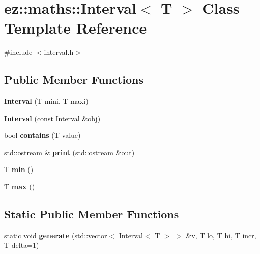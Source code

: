 \hypertarget{classez_1_1maths_1_1Interval}{}\section{ez\+:\+:maths\+:\+:Interval$<$ T $>$ Class Template Reference}
\label{classez_1_1maths_1_1Interval}


{\ttfamily \#include $<$interval.\+h$>$}

\subsection*{Public Member Functions}
\begin{DoxyCompactItemize}
\item 
\mbox{\label{classez_1_1maths_1_1Interval_a1218a10c0295b667a98e046f9bed9d96}} 
{\bfseries Interval} (T mini, T maxi)
\item 
\mbox{\label{classez_1_1maths_1_1Interval_acbf517711d35dd1141aac089c1a2ff5e}} 
{\bfseries Interval} (const \hyperlink{classez_1_1maths_1_1Interval}{Interval} \&obj)
\item 
\mbox{\label{classez_1_1maths_1_1Interval_a527a19ae2fa6939dece2ffd80b09ed46}} 
bool {\bfseries contains} (T value)
\item 
\mbox{\label{classez_1_1maths_1_1Interval_a6111df68f59687b9c871698fea164fba}} 
std\+::ostream \& {\bfseries print} (std\+::ostream \&out)
\item 
\mbox{\label{classez_1_1maths_1_1Interval_a2a4c3a1d0734ec0224240994e38977b9}} 
T {\bfseries min} ()
\item 
\mbox{\label{classez_1_1maths_1_1Interval_a71b16542e6fc2a4178e8aa17711f3f9b}} 
T {\bfseries max} ()
\end{DoxyCompactItemize}
\subsection*{Static Public Member Functions}
\begin{DoxyCompactItemize}
\item 
\mbox{\label{classez_1_1maths_1_1Interval_add29d54b27ee7fdf2be4f944de5b2b56}} 
static void {\bfseries generate} (std\+::vector$<$ \hyperlink{classez_1_1maths_1_1Interval}{Interval}$<$ T $>$ $>$ \&v, T lo, T hi, T incr, T delta=1)
\end{DoxyCompactItemize}
